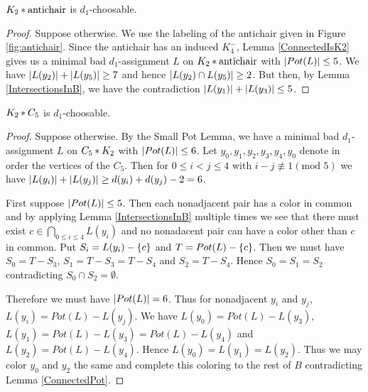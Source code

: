 \begin{lem}
$K_2 \mbox{\hspace{2 pt}$\ast$\hspace{2 pt}} \text{antichair}$ is $d_1$-choosable.
\label{antichair*K_2}\label{K2Antichair}
\end{lem}
\begin{proof}
Suppose otherwise. We use the labeling of the antichair given in Figure
\ref{fig:antichair}.  Since the antichair has an induced $K_4^-$, Lemma
\ref{ConnectedIsK2} gives us a minimal bad $d_1$-assignment $L$ on
$K_2 \mbox{\hspace{2 pt}$\ast$\hspace{2 pt}} \text{antichair}$ with $\left|Pot(L)\right| \leq 5$. We have $\left|L(y_2)\right| + \left|L(y_5)\right| \geq 7$ and hence $\left|L(y_2) \cap L(y_5)\right| \geq 2$.  But then, by Lemma \ref{IntersectionsInB}, we have the contradiction $\left|L(y_1)\right| + \left|L(y_3)\right| \leq 5$.
\end{proof}

\begin{lem}
$K_2 \mbox{\hspace{2 pt}$\ast$\hspace{2 pt}} C_5$ is $d_1$-choosable.
\label{C_5*K_2}
\end{lem}
\begin{proof}
Suppose otherwise. By the Small Pot Lemma, we have a minimal bad
$d_1$-assignment $L$ on $C_5 \mbox{\hspace{2 pt}$\ast$\hspace{2 pt}} K_2$ with $\left|Pot(L)\right| \leq 6$.  Let
$y_0, y_1, y_2, y_3, y_4, y_0$ denote in order the vertices of the $C_5$.  Then for $0 \leq i < j \leq 4$ with $i - j \not \equiv 1 (\text{mod }5)$ we have $\left|L(y_i)\right| + \left|L(y_j)\right| \geq d(y_i) + d(y_j) - 2 = 6$.

First suppose $\left|Pot(L)\right| \leq 5$.  Then each nonadjacent pair has a color in
common and by applying Lemma \ref{IntersectionsInB} multiple times we see that
there must exist $c \in \bigcap_{0 \leq i \leq 4} L(y_i)$ and no nonadacent
pair can have a color other than $c$ in common.  Put $S_i = L(y_i) - \left\{ c \right\}$
and $T = Pot(L) - \left\{ c \right\}$.  Then we must have $S_0 = T - S_3$, $S_1 = T - S_3
= T - S_4$ and $S_2 = T - S_4$.  Hence $S_0 = S_1 = S_2$ contradicting $S_0
\cap S_2 = \emptyset$.

Therefore we must have $\left|Pot(L)\right| = 6$.  Thus for nonadjacent $y_i$ and $y_j$, $L(y_i) = Pot(L) - L(y_j)$.  We have $L(y_0) = Pot(L) - L(y_3)$, $L(y_1) = Pot(L) - L(y_3) = Pot(L) - L(y_4)$ and $L(y_2) = Pot(L) - L(y_4)$.  Hence $L(y_0) = L(y_1) = L(y_2)$.  Thus we may color $y_0$ and $y_2$ the same and complete this coloring to the rest of $B$ contradicting Lemma \ref{ConnectedPot}.
\end{proof}

